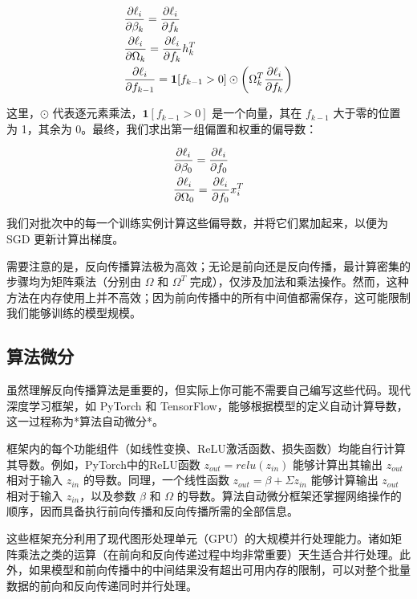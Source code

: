 \documentclass[lang=cn,newtx,10pt,scheme=chinese]{elegantbook}
\begin{document}
\begin{align}
&\frac{\partial \ell_i}{\partial \beta_k} = \frac{\partial \ell_i}{\partial f_k} \notag \\
&\frac{\partial \ell_i}{\partial \Omega_k} = \frac{\partial \ell_i}{\partial f_k} h_k^T \notag \\
&\frac{\partial \ell_i}{\partial f_{k-1}} = \mathbf{1}[f_{k-1} > 0] \odot \left( \Omega_k^T \frac{\partial \ell_i}{\partial f_k} \right)  
\end{align} 

这里，\(\odot\) 代表逐元素乘法，\(\mathbf{1}[f_{k-1} > 0]\) 是一个向量，其在 \(f_{k-1}\) 大于零的位置为 1，其余为 0。最终，我们求出第一组偏置和权重的偏导数：


\begin{align}
&\frac{\partial \ell_i}{\partial \beta_0} = \frac{\partial \ell_i}{\partial f_0} \notag \\
&\frac{\partial \ell_i}{\partial \Omega_0} = \frac{\partial \ell_i}{\partial f_0} x_i^T 
\end{align} 


我们对批次中的每一个训练实例计算这些偏导数，并将它们累加起来，以便为 SGD 更新计算出梯度。

需要注意的是，反向传播算法极为高效；无论是前向还是反向传播，最计算密集的步骤均为矩阵乘法（分别由 \(\Omega\) 和 \(\Omega^T\) 完成），仅涉及加法和乘法操作。然而，这种方法在内存使用上并不高效；因为前向传播中的所有中间值都需保存，这可能限制我们能够训练的模型规模。
\subsection{算法微分}
虽然理解反向传播算法是重要的，但实际上你可能不需要自己编写这些代码。现代深度学习框架，如 PyTorch 和 TensorFlow，能够根据模型的定义自动计算导数，这一过程称为*算法自动微分*。

框架内的每个功能组件（如线性变换、ReLU激活函数、损失函数）均能自行计算其导数。例如，PyTorch中的ReLU函数 \(z_{out} = relu(z_{in})\) 能够计算出其输出 \(z_{out}\) 相对于输入 \(z_{in}\) 的导数。同理，一个线性函数 \(z_{out} = \beta + \Sigma z_{in}\) 能够计算输出 \(z_{out}\) 相对于输入 \(z_{in}\)，以及参数 \(\beta\) 和 \(\Omega\) 的导数。算法自动微分框架还掌握网络操作的顺序，因而具备执行前向传播和反向传播所需的全部信息。

这些框架充分利用了现代图形处理单元（GPU）的大规模并行处理能力。诸如矩阵乘法之类的运算（在前向和反向传递过程中均非常重要）天生适合并行处理。此外，如果模型和前向传播中的中间结果没有超出可用内存的限制，可以对整个批量数据的前向和反向传递同时并行处理。
\end{document}
